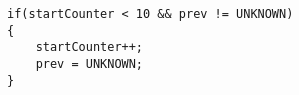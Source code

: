 
\begin{lstlisting}[style=customc, label={Kalman_start}, caption={Start Kalman}]
if(startCounter < 10 && prev != UNKNOWN)
{
    startCounter++;
    prev = UNKNOWN;
}
\end{lstlisting}



